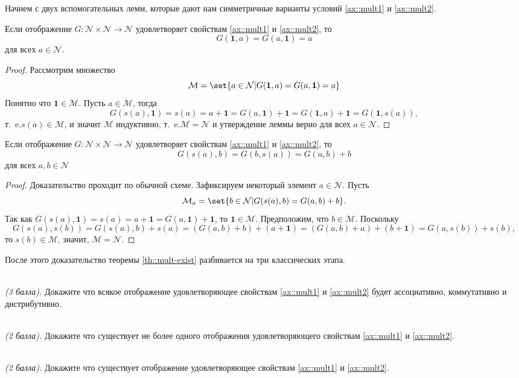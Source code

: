 \documentclass{article}
\newcommand{\ie}{т{.}~e{.}}
\begin{document}
\noindent Начнем с двух вспомогательных лемм, которые дают нам симметричные варианты условий \eqref{ax::mult1} и \eqref{ax::mult2}.
\begin{lemma}
    Если отображение \( G: \mathcal{N} \times \mathcal{N} \rightarrow \mathcal{N} \) удовлетворяет свойствам \eqref{ax::mult1} и \eqref{ax::mult2}, то 
    \[
        G(\mathbf{1}, a) = G(a, \mathbf{1}) = a 
    \] 
    для всех \(a \in \mathcal{N}\).
\end{lemma}
\begin{proof}
    Рассмотрим множество 
    \[
        \mathcal{M} = \set{a \in \mathcal{N} | G(\mathbf{1}, a) = G(a, \mathbf{1}) = a}
    \]
    Понятно что \(\mathbf{1} \in \mathcal{M}\). Пусть \(a \in \mathcal{M}\), тогда 
    \[
        G(s(a), \mathbf{1}) = s(a) = a + \mathbf{1} = G(a, \mathbf{1}) + \mathbf{1} = G(\mathbf{1}, a) + \mathbf{1} = G(\mathbf{1}, s(a)),
    \]
    \ie \(s(a) \in \mathcal{M}\), и значит \(\mathcal{M}\) индуктивно, \ie \(\mathcal{M} = \mathcal{N}\) и утверждение леммы верно для всех \(a \in \mathcal{N}\).
\end{proof}
\begin{lemma}
    Если отображение \( G: \mathcal{N} \times \mathcal{N} \rightarrow \mathcal{N} \) удовлетворяет свойствам \eqref{ax::mult1} и \eqref{ax::mult2}, то 
    \[
        G(s(a), b) = G(b, s(a)) = G(a, b) + b
    \] 
    для всех \(a, b \in \mathcal{N}\)
\end{lemma}
\begin{proof}
    Доказательство проходит по обычной схеме. Зафиксируем некоторый элемент \(a \in \mathcal{N}\). Пусть
    \[
        \mathcal{M}_{a} = \set{ b \in \mathcal{N} | G(s(a), b) = G(a, b) + b }.
    \]        
    Так как \(G(s(a), \mathbf{1}) = s(a) = a + \mathbf{1} = G(a, \mathbf{1}) + \mathbf{1} \), то \(\mathbf{1} \in \mathcal{M} \). Предположим, что \( b \in \mathcal{M} \). Поскольку
    \[
        G(s(a), s(b)) = G(s(a), b) + s(a) = (G(a, b) + b) + (a + \mathbf{1}) = (G(a, b) + a) + (b + \mathbf{1}) = G(a, s(b)) + s(b),
    \]
    то \( s(b) \in \mathcal{M} \), значит, \( \mathcal{M} = \mathcal{N} \).
\end{proof}

\noindent После этого доказательство теоремы \ref{th::mult-exist} разбивается на три классических этапа. 
\begin{?}\ \\
    \textit{(3 балла).} Докажите что всякое отображение удовлетворяющее свойствам \eqref{ax::mult1} и \eqref{ax::mult2} будет ассоциативно, коммутативно и дистрибутивно.
\end{?}
\begin{?}\ \\
    \textit{(2 балла).} Докажите что существует не более одного отображения удовлетворяющего свойствам \eqref{ax::mult1} и \eqref{ax::mult2}.
\end{?}
\begin{?}\ \\
    \textit{(2 балла).} Докажите что существует отображение удовлетворяющее свойствам \eqref{ax::mult1} и \eqref{ax::mult2}.
\end{?}
\end{document}
